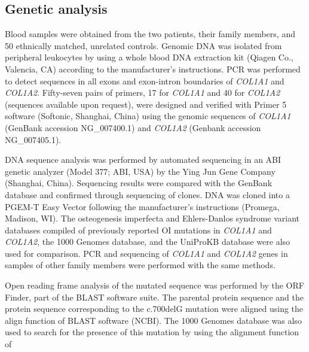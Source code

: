 \subsection*{Genetic analysis}\par Blood samples were obtained from the two patients, their family members, and 50
                    ethnically matched, unrelated controls. Genomic DNA was isolated from peripheral
                    leukocytes by using a whole blood DNA extraction kit (Qiagen Co., Valencia, CA)
                    according to the manufacturer’s instructions. PCR was performed to detect
                    sequences in all exons and exon-intron boundaries of \textit{COL1A1} and
                        \textit{COL1A2}. Fifty-seven pairs of primers, 17 for
                        \textit{COL1A1} and 40 for \textit{COL1A2} (sequences
                    available upon request), were designed and verified with Primer 5 software
                    (Softonic, Shanghai, China) using the genomic sequences of
                        \textit{COL1A1} (GenBank accession NG\_007400.1) and
                        \textit{COL1A2} (Genbank accession NG\_007405.1).\par DNA sequence analysis was performed by automated sequencing in an ABI genetic
                    analyzer (Model 377; ABI, USA) by the Ying Jun Gene Company (Shanghai, China).
                    Sequencing results were compared with the GenBank database and confirmed through
                    sequencing of clones. DNA was cloned into a PGEM-T Easy Vector following the
                    manufacturer’s instructions (Promega, Madison, WI). The osteogenesis imperfecta
                    and Ehlers-Danlos syndrome variant databases compiled of previously reported OI
                    mutations in \textit{COL1A1} and \textit{COL1A2}, the 1000
                    Genomes database, and the UniProKB database were also used for comparison. PCR
                    and sequencing of \textit{COL1A1} and \textit{COL1A2} genes in
                    samples of other family members were performed with the same methods.\par Open reading frame analysis of the mutated sequence was performed by the ORF
                    Finder, part of the BLAST software suite. The parental protein sequence and the
                    protein sequence corresponding to the c.700delG mutation were aligned using the
                    align function of BLAST software (NCBI). The 1000 Genomes database was also used
                    to search for the presence of this mutation by using the alignment function of
